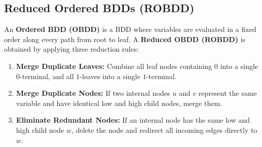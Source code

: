 \documentclass[12pt,a4paper]{article}
\begin{document}
\subsection{Reduced Ordered BDDs (ROBDD)}
An \textbf{Ordered BDD (OBDD)} is a BDD where variables are evaluated in a fixed order along every path from root to leaf. A \textbf{Reduced OBDD (ROBDD)} is obtained by applying three reduction rules:
\begin{enumerate}[leftmargin=*, itemsep=2pt]
  \item \textbf{Merge Duplicate Leaves:} Combine all leaf nodes containing $0$ into a single $0$-terminal, and all $1$-leaves into a single $1$-terminal.
  \item \textbf{Merge Duplicate Nodes:} If two internal nodes $u$ and $v$ represent the same variable and have identical low and high child nodes, merge them.
  \item \textbf{Eliminate Redundant Nodes:} If an internal node has the same low and high child node $w$, delete the node and redirect all incoming edges directly to $w$.
\end{enumerate}
\end{document}
